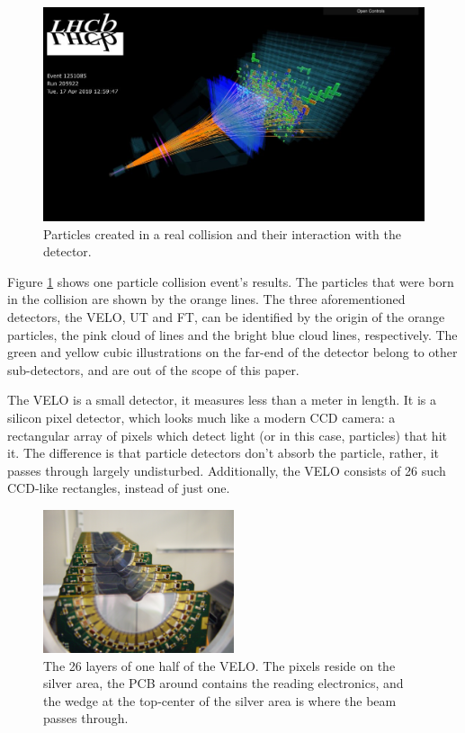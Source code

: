 \documentclass[12pt]{article}
\begin{document}
\begin{figure}[H]
	\includegraphics[width=\textwidth]{lbevent_collision_example}
	\caption{Particles created in a real collision and their interaction with the detector.}
	\label{fig_lhcb_lbevent_collision}
\end{figure}


Figure \ref{fig_lhcb_lbevent_collision} shows one particle collision event's results. The particles that were born in the collision are shown by the orange lines. The three aforementioned detectors, the VELO, UT and FT, can be identified by the origin of the orange particles, the pink cloud of lines and the bright blue cloud lines, respectively. The green and yellow cubic illustrations on the far-end of the detector belong to other sub-detectors, and are out of the scope of this paper.

The VELO is a small detector, it measures less than a meter in length. It is a silicon pixel detector, which looks much like a modern CCD camera: a rectangular array of pixels which detect light (or in this case, particles) that hit it. The difference is that particle detectors don't absorb the particle, rather, it passes through largely undisturbed. Additionally, the VELO consists of 26 such CCD-like rectangles, instead of just one.

\begin{figure}[H]
	\begin{center}
		\includegraphics[width=0.5\textwidth]{detector_velo_real}
	\end{center}
	\caption{The 26 layers of one half of the VELO. The pixels reside on the silver area, the PCB around contains the reading electronics, and the wedge at the top-center of the silver area is where the beam passes through.}
	\label{fig_detector_velo_real}
\end{figure}
\end{document}
